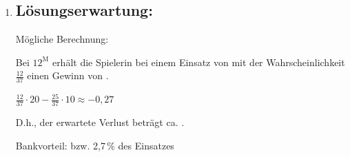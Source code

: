 \begin{langesbeispiel}
{\begin{enumerate}
Die Argumentation ist falsch. Da die einzelnen Spiele unabhängig voneinander sind, gilt auch für das sechste Spiel (unabhängig von den vorherigen Spielausgängen):

$P(\text{"`Rouge"'})=P(\text{"`Noir"'})=\frac{18}{37}$\leer

Mögliche Berechnung (z.B. durch Approximation durch die Normalverteilung ohne Stetigkeitskorrektur):  

Die binomialverteilte Zufallsvariable $X$ beschreibt, wie oft die Kugel in ein rotes Nummernfach fällt.

$n=100, p=\frac{18}{37}$

$P(X\leq 40)\approx 0,0418$ 

	\subsection{Lösungsschlüssel:}
	\begin{itemize}
		\item  Ein Punkt für die Angabe, dass die Argumentation nicht richtig ist, und für eine (sinngemäß) korrekte Begründung.
		\item  Ein Ausgleichspunkt für die richtige Lösung, wobei Ergebnisse durch Berechnung mit Stetigkeitskorrektur oder exakt mittels Binomialverteilung ebenfalls als richtig zu werten sind. Andere Schreibweisen des Ergebnisses (in Prozent) sind ebenfalls als richtig zu werten. 
		
		Toleranzintervall: $[0,03; 0,06]$  
		
		Die Aufgabe ist auch dann als richtig gelöst zu werten, wenn bei korrektem Ansatz das Ergebnis aufgrund eines Rechenfehlers nicht richtig ist. 
	\end{itemize}
	
	\item \subsection{Lösungserwartung:}
			
	Mögliche Berechnung:
	
	Bei $12^\text{M}$ erhält die Spielerin bei einem Einsatz von  mit der Wahrscheinlichkeit $\frac{12}{37}$ einen Gewinn von .
	
	$\frac{12}{37}\cdot 20-\frac{25}{37}\cdot 10\approx -0,27$
	
	D.h., der erwartete Verlust beträgt ca. .
	
	Bankvorteil:  bzw. 2,7\,\% des Einsatzes\leer
	

\end{enumerate}}
\end{langesbeispiel}

